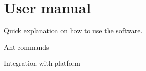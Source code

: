 \chapter{User manual}

Quick explanation on how to use the software.

Ant commands

Integration with platform

